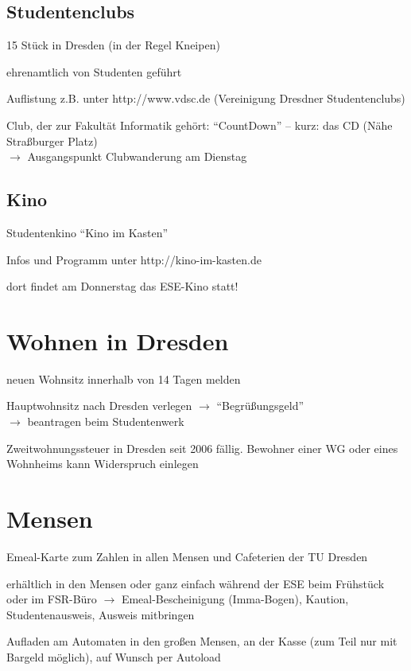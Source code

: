 \documentclass[a4paper,12pt]{report}
\begin{document}
\subsection{Studentenclubs}
\begin{itemize*}
    \item 15 Stück in Dresden (in der Regel Kneipen)
    \item ehrenamtlich von Studenten geführt
    \item  Auflistung z.B. unter http://www.vdsc.de (Vereinigung Dresdner Studentenclubs)
    \item Club, der zur Fakultät Informatik gehört: \enquote{CountDown} -- kurz: das CD (Nähe Straßburger Platz)\\
    $\rightarrow$ Ausgangspunkt Clubwanderung am Dienstag
\end{itemize*}

\subsection{Kino}
\begin{itemize*}
    \item Studentenkino \enquote{Kino im Kasten}
    \item Infos und Programm unter http://kino-im-kasten.de
    \item dort findet am Donnerstag das ESE-Kino statt!
\end{itemize*}


\section{Wohnen in Dresden}
\begin{itemize*}

    \item neuen Wohnsitz innerhalb von 14 Tagen melden
    \item Hauptwohnsitz nach Dresden verlegen $\rightarrow$  \enquote{Begrüßungsgeld}\\
  $\rightarrow$ beantragen beim Studentenwerk
  \item Zweitwohnungssteuer in Dresden seit 2006 fällig. Bewohner einer WG oder eines Wohnheims kann Widerspruch einlegen
\end{itemize*}

\section{Mensen}
\begin{itemize*}
    \item Emeal-Karte zum Zahlen in allen Mensen und Cafeterien der TU Dresden
    \item erhältlich in den Mensen oder ganz einfach während der ESE beim Frühstück oder im FSR-Büro
    $\rightarrow$ Emeal-Bescheinigung (Imma-Bogen),  Kaution, Studentenausweis, Ausweis mitbringen
    \item Aufladen am Automaten in den großen Mensen, an der Kasse (zum Teil nur mit Bargeld möglich), auf Wunsch per Autoload
\end{itemize*}
\end{document}
